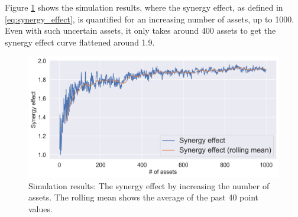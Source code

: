 \documentclass[conference]{IEEEtran}
\begin{document}

Figure \ref{fig:synergy_effect} shows the simulation results, where the synergy effect, as defined in \eqref{eq:synergy_effect}, is quantified for an increasing number of assets, up to 1000. Even with such uncertain assets, it only takes around 400 assets to get the synergy effect curve flattened around 1.9. 


\begin{figure}[b]
    \centering
    \includegraphics[width=\columnwidth]{figures/synergy_effect.png}
    \caption{Simulation results: The synergy effect by increasing the number of assets. The rolling mean shows the average of the past 40 point values.}
    \label{fig:synergy_effect}
\end{figure}

\end{document}

